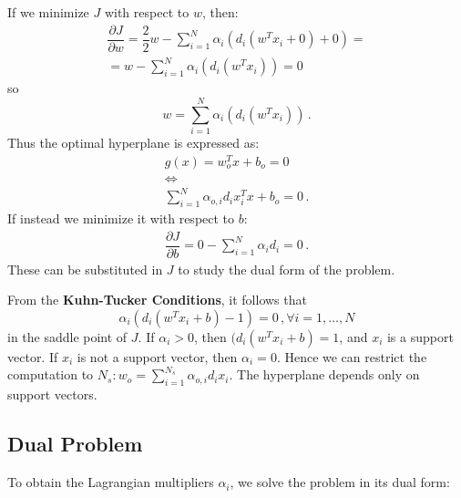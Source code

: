 If we minimize $J$ with respect to $w$, then:
\begin{gather*}
    \dfrac{\partial J}{\partial w} = \dfrac{2}{2} w - \sum_{i=1}^N \alpha_i(d_i(w^T x_i + 0) + 0) = \\
    = w - \sum_{i=1}^N \alpha_i(d_i(w^T x_i)) = 0
\end{gather*}
so
\begin{equation*}
    w = \sum_{i=1}^N \alpha_i(d_i(w^T x_i)) \, .
\end{equation*}
Thus the optimal hyperplane is expressed as:
\begin{gather*}
    g(x) = w_o^T x + b_o = 0 \\
    \iff \\
    \sum_{i=1}^N \alpha_{o,i} d_i x_i^T x + b_o = 0 \, .
\end{gather*}
If instead we minimize it with respect to $b$:
\begin{gather*}
    \dfrac{\partial J}{\partial b} = 0 - \sum_{i=1}^N \alpha_i d_i = 0 \, .
\end{gather*}
These can be substituted in $J$ to study the dual form of the problem.

From the \textbf{Kuhn-Tucker Conditions}, it follows that
\begin{equation*}
    \alpha_i (d_i (w^T x_i + b) - 1) = 0 \, , \forall i = 1, \dots , N
\end{equation*}
in the saddle point of $J$. If $\alpha_i > 0$, then $(d_i (w^T x_i + b) = 1$, and $x_i$ is a support vector. If $x_i$ is not a support vector, then $\alpha_i = 0$. Hence we can restrict the computation to $N_s : w_o = \sum_{i=1}^{N_s} \alpha_{o,i} d_i x_i$. The hyperplane depends only on support vectors.

\subsection{Dual Problem}

To obtain the Lagrangian multipliers $\alpha_i$, we solve the problem in its dual form:


